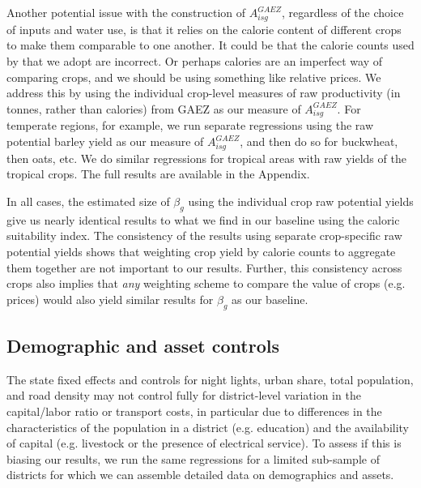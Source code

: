 \documentclass[11pt]{article}
\begin{document}
Another potential issue with the construction of $A^{GAEZ}_{isg}$, regardless of the choice of inputs and water use, is that it relies on the calorie content of different crops to make them comparable to one another. It could be that the calorie counts used by \cite{galorozak2016} that we adopt are incorrect. Or perhaps calories are an imperfect way of comparing crops, and we should be using something like relative prices. We address this by using the individual crop-level measures of raw productivity (in tonnes, rather than calories) from GAEZ as our measure of $A^{GAEZ}_{isg}$. For temperate regions, for example, we run separate regressions using the raw potential barley yield as our measure of $A^{GAEZ}_{isg}$, and then do so for buckwheat, then oats, etc. We do similar regressions for tropical areas with raw yields of the tropical crops. The full results are available in the Appendix. 

In all cases, the estimated size of $\beta_g$ using the individual crop raw potential yields give us nearly identical results to what we find in our baseline using the caloric suitability index. The consistency of the results using separate crop-specific raw potential yields shows that weighting crop yield by calorie counts to aggregate them together are not important to our results. Further, this consistency across crops also implies that \textit{any} weighting scheme to compare the value of crops (e.g. prices) would also yield similar results for $\beta_g$ as our baseline. 

\subsection{Demographic and asset controls} 
The state fixed effects and controls for night lights, urban share, total population, and road density may not control fully for district-level variation in the capital/labor ratio or transport costs, in particular due to differences in the characteristics of the population in a district (e.g. education) and the availability of capital (e.g. livestock or the presence of electrical service). To assess if this is biasing our results, we run the same regressions for a limited sub-sample of districts for which we can assemble detailed data on demographics and assets.
\end{document}
